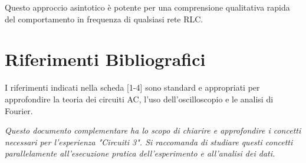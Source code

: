 \documentclass[a4paper, 11pt]{article}
\begin{document}
Questo approccio asintotico è potente per una comprensione qualitativa rapida del comportamento in frequenza di qualsiasi rete RLC.

\section*{Riferimenti Bibliografici}
I riferimenti indicati nella scheda [1-4] sono standard e appropriati per approfondire la teoria dei circuiti AC, l'uso dell'oscilloscopio e le analisi di Fourier.

\vspace{1cm}
\textit{Questo documento complementare ha lo scopo di chiarire e approfondire i concetti necessari per l'esperienza "Circuiti 3". Si raccomanda di studiare questi concetti parallelamente all'esecuzione pratica dell'esperimento e all'analisi dei dati.}
\end{document}

